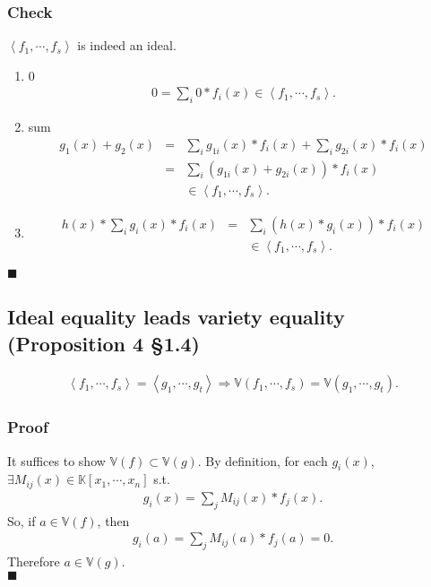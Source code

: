\documentclass[11pt]{book}
\begin{document}
\subsubsection{Check}
$\left< f_1, \cdots, f_s \right> $ is indeed an ideal.
\begin{enumerate}
\item 0
\begin{eqnarray}
0 = \sum_i 0 * f_i(x) \in \left< f_1, \cdots, f_s \right>.
\end{eqnarray}

\item sum
\begin{eqnarray}
g_1(x) + g_2(x) &=& \sum_i g_{1i}(x) * f_i(x) + \sum_i g_{2i}(x) * f_i(x) \\
&=& \sum_i (g_{1i}(x) + g_{2i}(x)) * f_i(x) \\
&& \in \left< f_1, \cdots, f_s \right>.
\end{eqnarray}

\item 
\begin{eqnarray}
h(x) * \sum_i g_{i}(x) * f_i(x) &=& \sum_i \left( h(x) *g_{i}(x) \right) * f_i(x) \\
&& \in \left< f_1, \cdots, f_s \right>.
\end{eqnarray}

\end{enumerate}
$\blacksquare$

\subsection{Ideal equality leads variety equality (Proposition 4 \S1.4)}
\begin{eqnarray}
\left< f_1, \cdots, f_s \right> = \left< g_1, \cdots, g_t \right> \Rightarrow \mathbb{V}(f_1, \cdots, f_s) = \mathbb{V}(g_1, \cdots, g_t).
\end{eqnarray}

\subsubsection{Proof}
It suffices to show $\mathbb{V}(f) \subset \mathbb{V}(g)$.
By definition, for each $g_i(x)$, $\exists M_{ij}(x) \in \mathbb{K}[x_1,\cdots,x_n]$ s.t.
\begin{eqnarray}
g_i(x) = \sum_j M_{ij}(x) * f_j(x).
\end{eqnarray}
So, if $a \in \mathbb{V}(f)$, then
\begin{eqnarray}
g_i(a) = \sum_j M_{ij}(a) * f_j(a) = 0.
\end{eqnarray}
Therefore $a \in \mathbb{V}(g)$.\\
$\blacksquare$
\end{document}
